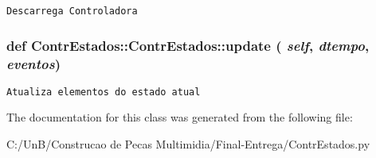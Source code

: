 \begin{footnotesize}\begin{verbatim}Descarrega Controladora\end{verbatim}
\end{footnotesize}
 \hypertarget{class_contr_estados_1_1_contr_estados_c512038ba8b7fe6122aa7bb94d14795a}{
\subsubsection[{update}]{\setlength{\rightskip}{0pt plus 5cm}def ContrEstados::ContrEstados::update ( {\em self}, \/   {\em dtempo}, \/   {\em eventos})}}
\label{class_contr_estados_1_1_contr_estados_c512038ba8b7fe6122aa7bb94d14795a}




\begin{footnotesize}\begin{verbatim}Atualiza elementos do estado atual\end{verbatim}
\end{footnotesize}
 

The documentation for this class was generated from the following file:\begin{CompactItemize}
\item 
C:/UnB/Construcao de Pecas Multimidia/Final-Entrega/ContrEstados.py\end{CompactItemize}
